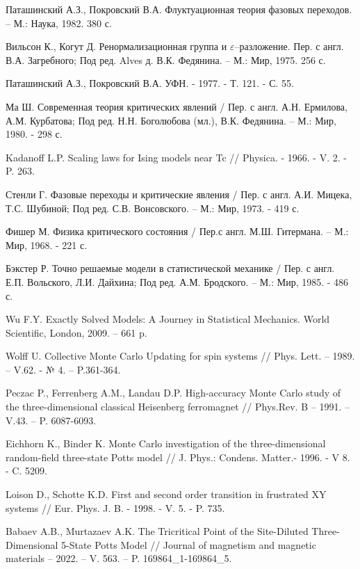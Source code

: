 \begin{thebibliography}{111}

Паташинский А.З., Покровский В.А. Флуктуационная теория фазовых переходов. -- М.: Наука, 1982. 380 с.

Вильсон К., Когут Д. Ренормализационная группа и $\varepsilon$--разложение. Пер. с англ. В.А. Загребного; Под ред. Alves д. В.К. Федянина. -- М.: Мир, 1975. 256 с.

Паташинский А.З., Покровский В.А. УФН. - 1977. - Т. 121. - С. 55.

Ма Ш. Современная теория критических явлений / Пер. с англ. А.Н. Ермилова, А.М. Курбатова; Под ред. Н.Н. Боголюбова (мл.), В.К. Федянина. -- М.: Мир, 1980. - 298 с.

Kadanoff L.P. Scaling laws for Ising models near Tc // Physica. - 1966. - V. 2. - P. 263.

Стенли Г. Фазовые переходы и критические явления / Пер. с англ. А.И.  Мицека, Т.С. Шубиной; Под ред. С.В. Вонсовского. -- М.: Мир, 1973. - 419 с.

Фишер М. Физика критического состояния / Пер.с англ. М.Ш. Гитермана. -- М.: Мир, 1968. - 221 с.

Бэкстер Р. Точно решаемые модели в статистической механике / Пер. с англ. Е.П. Вольского, Л.И. Дайхина; Под ред. А.М. Бродского. -- М.: Мир, 1985. - 486 с.

Wu F.Y. Exactly Solved Models: A Journey in Statistical Mechanics. World Scientific, London, 2009. -- 661 p.

Wolff U. Collective Monte Carlo Updating for spin systems // Phys. Lett. -- 1989. -- V.62. - № 4. -- P.361-364.

Peczac P., Ferrenberg A.M., Landau D.P. High-accuracy Monte Carlo study of the three-dimensional classical Heisenberg ferromagnet // Phys.Rev. B -- 1991. --V.43. -- P. 6087-6093.

Eichhorn K., Binder K. Monte Carlo investigation of the three-dimensional random-field three-state Potts model // J. Phys.: Condens. Matter.- 1996. - V 8. - C. 5209.

Loison D., Schotte K.D. First and second order transition in frustrated XY systems // Eur. Phys. J. B. - 1998. - V. 5. - P. 735.

Babaev A.B., Murtazaev A.K. The Tricritical Point of the Site-Diluted Three-Dimensional 5-State Potts Model // Journal of magnetism and magnetic materials -- 2022. -- V. 563. -- P. 169864\_1-169864\_5.


\end{thebibliography}
